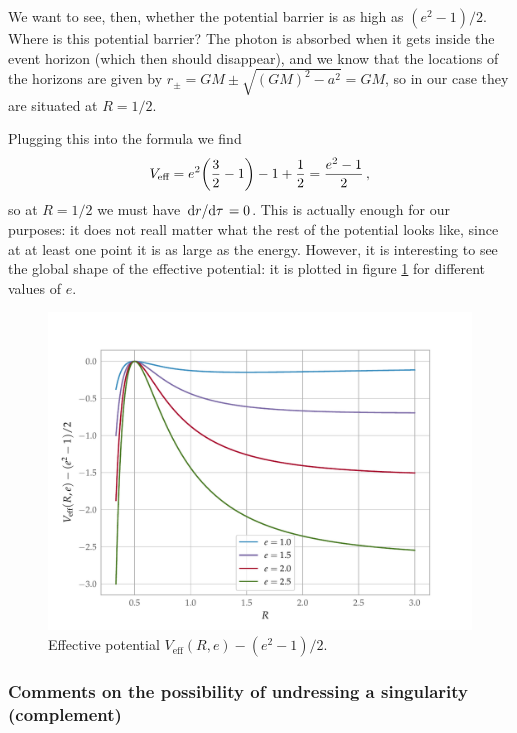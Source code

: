 \documentclass[main.tex]{subfiles}
\begin{document}
We want to see, then, whether the potential barrier is as high as \((e^2- 1) /2\). Where is this potential barrier? 
The photon is absorbed when it gets inside the event horizon (which then should disappear), and we know that the locations of the horizons are given by \(r_{\pm} = GM \pm \sqrt{(GM)^2 - a^2} = GM\), so in our case they are situated at \(R = 1/2\). 

Plugging this into the formula we find 
%
\begin{align}
  V _{\text{eff}} = e^2 \qty(\frac{3}{2} - 1) - 1 + \frac{1}{2} = \frac{e^2 -1}{2}
\,,
\end{align}
%
so at \(R = 1/2\) we must have \(\dv*{r}{\tau } = 0\).
This is actually enough for our purposes: it does not reall matter what the rest of the potential looks like, since at at least one point it is as large as the energy. However, it is interesting to see the global shape of the effective potential: it is plotted in figure \ref{fig:residual-potential} for different values of \(e\). 

\begin{figure}[ht]
  \centering
  \includegraphics[width=\textwidth]{figures/potential_barrier}
  \caption{Effective potential \(V _{\text{eff}} (R, e) - (e^2 -1) / 2\).}
  \label{fig:residual-potential}
\end{figure}

\subsubsection{Comments on the possibility of undressing a singularity (complement)}
\end{document}
